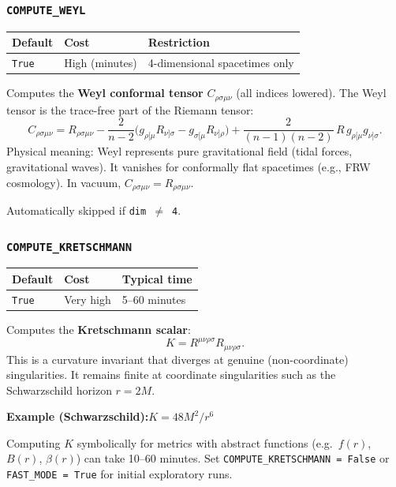 \documentclass[11pt,a4paper]{article}
\newcommand{\code}[1]{\texttt{\small#1}}
\begin{document}
\subsubsection{\code{COMPUTE\_WEYL}}

\begin{center}
\begin{tabular}{lll}
  \toprule
  Default & Cost & Restriction \\
  \midrule
  \code{True} & High (minutes) & 4-dimensional spacetimes only \\
  \bottomrule
\end{tabular}
\end{center}

Computes the \textbf{Weyl conformal tensor} $C_{\rho\sigma\mu\nu}$
(all indices lowered).  The Weyl tensor is the trace-free part of the
Riemann tensor:
\[
  C_{\rho\sigma\mu\nu}
  = R_{\rho\sigma\mu\nu}
  - \frac{2}{n-2}\bigl(g_{\rho[\mu}R_{\nu]\sigma}
    - g_{\sigma[\mu}R_{\nu]\rho}\bigr)
  + \frac{2}{(n-1)(n-2)}\,R\,g_{\rho[\mu}g_{\nu]\sigma}.
\]
Physical meaning: Weyl represents pure gravitational field (tidal forces,
gravitational waves).  It vanishes for conformally flat spacetimes (e.g.,
FRW cosmology).  In vacuum, $C_{\rho\sigma\mu\nu} = R_{\rho\sigma\mu\nu}$.

Automatically skipped if \code{dim $\neq$ 4}.

\subsubsection{\code{COMPUTE\_KRETSCHMANN}}

\begin{center}
\begin{tabular}{lll}
  \toprule
  Default & Cost & Typical time \\
  \midrule
  \code{True} & Very high & 5--60 minutes \\
  \bottomrule
\end{tabular}
\end{center}

Computes the \textbf{Kretschmann scalar}:
\[
  K = R^{\mu\nu\rho\sigma}R_{\mu\nu\rho\sigma}.
\]
This is a curvature invariant that diverges at genuine (non-coordinate)
singularities.  It remains finite at coordinate singularities such as the
Schwarzschild horizon $r=2M$.

\textbf{Example (Schwarzschild):}\quad $K = 48M^2 / r^6$

\begin{warnbox}
  Computing $K$ symbolically for metrics with abstract functions
  (e.g.\ $f(r)$, $B(r)$, $\beta(r)$) can take 10--60 minutes.
  Set \code{COMPUTE\_KRETSCHMANN = False} or \code{FAST\_MODE = True}
  for initial exploratory runs.
\end{warnbox}
\end{document}
